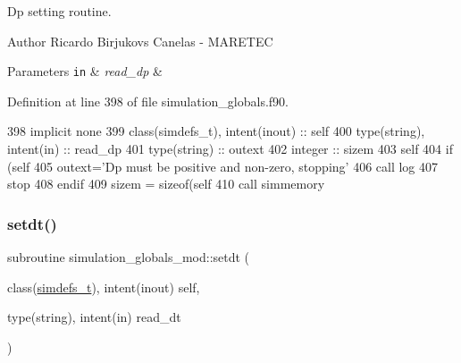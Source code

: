 Dp setting routine. 

\begin{DoxyAuthor}{Author}
Ricardo Birjukovs Canelas -\/ M\+A\+R\+E\+T\+EC
\end{DoxyAuthor}

\begin{DoxyParams}[1]{Parameters}
\mbox{\tt in}  & {\em read\+\_\+dp} & \\
\hline
\end{DoxyParams}


Definition at line 398 of file simulation\+\_\+globals.\+f90.


\begin{DoxyCode}
398     \textcolor{keywordtype}{implicit none}
399     \textcolor{keywordtype}{class}(simdefs\_t), \textcolor{keywordtype}{intent(inout)} :: self
400     \textcolor{keywordtype}{type}(string), \textcolor{keywordtype}{intent(in)} :: read\_dp
401     \textcolor{keywordtype}{type}(string) :: outext
402     \textcolor{keywordtype}{integer} :: sizem
403     self%
404     \textcolor{keywordflow}{if} (self%
405         outext=\textcolor{stringliteral}{'Dp must be positive and non-zero, stopping'}
406         \textcolor{keyword}{call }log%
407         stop
408 \textcolor{keywordflow}{    endif}
409     sizem = sizeof(self%
410     \textcolor{keyword}{call }simmemory%
\end{DoxyCode}
\mbox{\label{namespacesimulation__globals__mod_aecf75eeccef4eeae6d10ab26cf2dcfcf}} 
\subsubsection{\texorpdfstring{setdt()}{setdt()}}
{\footnotesize\ttfamily subroutine simulation\+\_\+globals\+\_\+mod\+::setdt (\begin{DoxyParamCaption}\item[{class(\mbox{\hyperlink{structsimulation__globals__mod_1_1simdefs__t}{simdefs\+\_\+t}}), intent(inout)}]{self,  }\item[{type(string), intent(in)}]{read\+\_\+dt }\end{DoxyParamCaption})\hspace{0.3cm}{\ttfamily [private]}}



